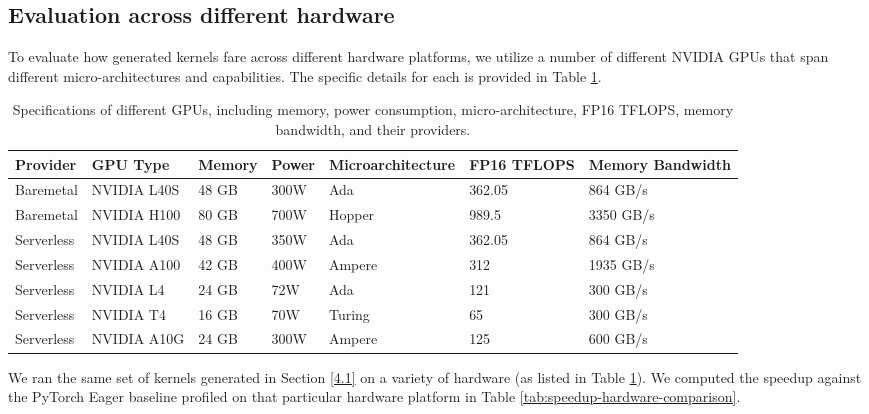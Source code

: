 \subsection{Evaluation across different hardware}

To evaluate how generated kernels fare across different hardware platforms, we utilize a number of different NVIDIA GPUs that span different micro-architectures and capabilities. The specific details for each is provided in Table \ref{tab:gpu_specifications}.

\begin{table}[ht]
\centering
\begin{tabular}{lllllll}
\hline

\textbf{Provider} & \textbf{GPU Type} & \textbf{Memory} & \textbf{Power} & \textbf{Microarchitecture} & \textbf{FP16 TFLOPS} & \textbf{Memory Bandwidth}\\ 
\hline

Baremetal& NVIDIA L40S       & 48 GB           & 300W           & Ada      & 362.05 & 864 GB/s                 \\ 
Baremetal& NVIDIA H100       & 80 GB           & 700W           & Hopper      & 989.5 & 3350 GB/s              \\ 
Serverless& NVIDIA L40S       & 48 GB           & 350W           & Ada       & 362.05 & 864 GB/s                \\ 
Serverless& NVIDIA A100       & 42 GB           & 400W           & Ampere    & 312 & 1935 GB/s                \\ 
Serverless& NVIDIA L4         & 24 GB           & 72W            & Ada       & 121 & 300 GB/s                \\ 
Serverless& NVIDIA T4         & 16 GB           & 70W            & Turing     & 65 & 300 GB/s               \\ 
Serverless& NVIDIA A10G       & 24 GB           & 300W           & Ampere      & 125 & 600 GB/s              \\ 
\hline

\end{tabular}
\caption{Specifications of different GPUs, including memory, power consumption, micro-architecture, FP16 TFLOPS, memory bandwidth, and their providers.}
\label{tab:gpu_specifications}
\end{table}

\noindent We ran the same set of kernels generated in Section \ref{4.1} on a variety of hardware (as listed in Table \ref{tab:gpu_specifications}). We computed the  speedup against the PyTorch Eager baseline profiled on that particular hardware platform in Table \ref{tab:speedup-hardware-comparison}.

